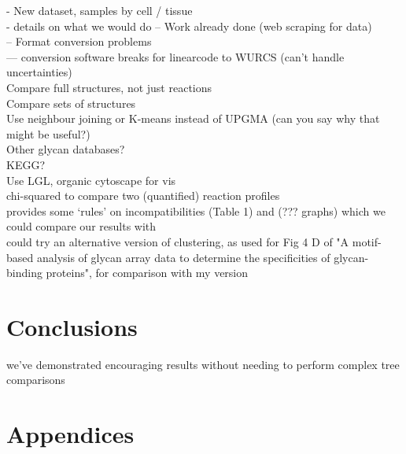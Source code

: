 \documentclass[12pt,a4paper]{article}
\begin{document}
- New dataset, samples by cell / tissue\\
- details on what we would do
-- Work already done (web scraping for data)\\
-- Format conversion problems\\
--- conversion software breaks for linearcode to WURCS (can't handle uncertainties)\\

Compare full structures, not just reactions\\

Compare sets of structures\\

Use neighbour joining or K-means instead of UPGMA (can you say why that might be useful?)\\

Other glycan databases?\\

KEGG?\\

Use LGL, organic cytoscape for vis\\

chi-squared to compare two (quantified) reaction profiles\\

\citep{porter2009motif} provides some `rules' on incompatibilities (Table 1) and (??? graphs) which we could compare our results with\\

could try an alternative version of clustering, as used for Fig 4 D of "A motif-based analysis of glycan array data to determine the specificities of glycan-binding proteins", for comparison with my version\\

\newpage
\section{Conclusions}
\label{sec:conclusions}

we've demonstrated encouraging results without needing to perform complex tree comparisons\\

\newpage




\newpage
\section*{Appendices}
\appendix
\end{document}
